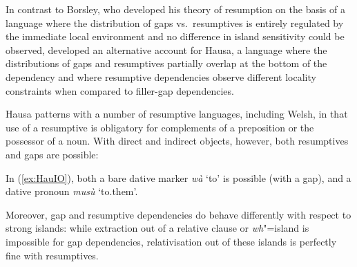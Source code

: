 \documentclass[output=paper
	        ,collection
	        ,collectionchapter
 	        ,biblatex
                ,babelshorthands
                ,newtxmath
                ,draftmode
                ,colorlinks, citecolor=brown
]{langscibook}
\begin{document}
{In contrast to Borsley, who developed his theory of resumption on the
basis of a language where the distribution of gaps vs.\ resumptives is
entirely regulated by the immediate local environment and no
difference in island sensitivity could be observed,
\citet{Crysmann:12} developed an alternative account for Hausa, a
language where the distributions of gaps and resumptives partially
overlap at the bottom of the dependency and where resumptive
dependencies observe different locality constraints when compared to
filler-gap dependencies.

Hausa patterns with a number of resumptive languages, including Welsh, in that use of a resumptive is obligatory for complements of a preposition or the possessor of a noun. With direct and indirect objects, however, both resumptives and gaps are possible: 

\begin{exe}
  \ex \label{ex:HauIO}
  \begin{xlist}
     
  \end{xlist}
\end{exe}


\noindent
In (\ref{ex:HauIO}), both a bare dative marker \textit{wà} `to' is
possible (with a gap), and a dative pronoun \textit{musù} `to.them'.

Moreover, gap and resumptive dependencies do behave differently with
respect to strong islands: while extraction out of a relative clause
or \emph{wh}"=island is impossible for gap dependencies,
relativisation out of these islands is perfectly fine with
resumptives.

\begin{exe}
   \label{ex:HauResLongIO}
\end{exe}

}
\end{document}
